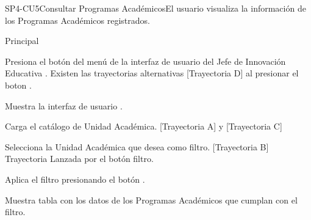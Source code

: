 \begin{UseCase}{SP4-CU5}{Consultar Programas Académicos}{El usuario visualiza la información de los Programas Académicos registrados.}




\end{UseCase}


\begin{UCtrayectoria}{Principal}

    \UCpaso[\UCactor] Presiona el botón  del menú de la interfaz de usuario del Jefe de Innovación Educativa  . Existen las trayectorias alternativas [Trayectoria D] al presionar el boton  .

    \UCpaso Muestra la interfaz de usuario .

    \UCpaso Carga el catálogo de Unidad Académica. [Trayectoria A] y [Trayectoria C]

    \UCpaso[\UCactor] Selecciona la Unidad Académica que desea como filtro. [Trayectoria B] Trayectoria Lanzada por el botón filtro.

    \UCpaso[\UCactor] Aplica el filtro presionando el botón .

    \UCpaso Muestra tabla con los datos de los Programas Académicos que cumplan con el filtro.

\end{UCtrayectoria}


